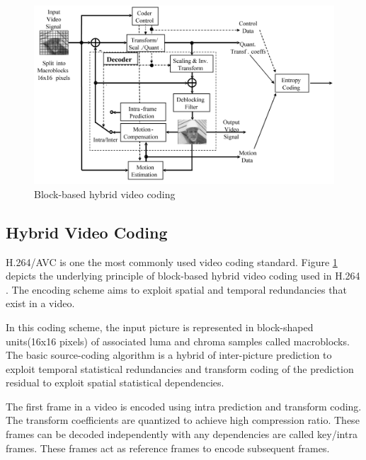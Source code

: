 \documentclass[11pt]{article} %
\begin{document}
\begin{figure}[h]
	\centering
	\includegraphics[scale=0.5]{general/Hybrid_video_coding.png}
	\caption{Block-based hybrid video coding}
	\label{fig:Hybrid Video Coding}
\end{figure}

\subsection{Hybrid Video Coding}
H.264/AVC is one the most commonly used video coding standard. Figure \ref{fig:Hybrid Video Coding} depicts the underlying principle of block-based hybrid video coding used in H.264 \cite{h.264-overview}. The encoding scheme aims to exploit spatial and temporal redundancies that exist in a video. 


In this coding scheme, the input picture is represented in block-shaped units(16x16 pixels) of associated luma and chroma samples called macroblocks. The basic source-coding algorithm is a hybrid of inter-picture prediction to exploit temporal statistical redundancies and transform coding of the prediction residual to exploit spatial statistical dependencies. 

The first frame in a video is encoded using intra prediction and transform coding. The transform coefficients are quantized to achieve high compression ratio. These frames can be decoded independently with any dependencies are called key/intra frames. These frames act as reference frames to encode subsequent frames.
\end{document}
